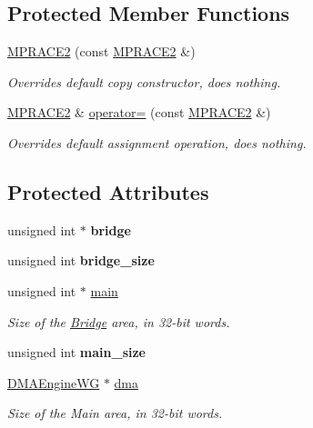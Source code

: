 \subsection*{Protected Member Functions}
\begin{CompactItemize}
\item 
\hyperlink{classmprace_1_1MPRACE2_b0}{MPRACE2} (const \hyperlink{classmprace_1_1MPRACE2}{MPRACE2} \&)
\begin{CompactList}\small\item\em Overrides default copy constructor, does nothing. \item\end{CompactList}\item 
\hyperlink{classmprace_1_1MPRACE2}{MPRACE2} \& \hyperlink{classmprace_1_1MPRACE2_b1}{operator=} (const \hyperlink{classmprace_1_1MPRACE2}{MPRACE2} \&)
\begin{CompactList}\small\item\em Overrides default assignment operation, does nothing. \item\end{CompactList}\end{CompactItemize}
\subsection*{Protected Attributes}
\begin{CompactItemize}
\item 
\hypertarget{classmprace_1_1MPRACE2_p0}{
unsigned int $\ast$ {\bf bridge}}
\label{classmprace_1_1MPRACE2_p0}

\item 
\hypertarget{classmprace_1_1MPRACE2_p1}{
unsigned int {\bf bridge\_\-size}}
\label{classmprace_1_1MPRACE2_p1}

\item 
\hypertarget{classmprace_1_1MPRACE2_p2}{
unsigned int $\ast$ \hyperlink{classmprace_1_1MPRACE2_p2}{main}}
\label{classmprace_1_1MPRACE2_p2}

\begin{CompactList}\small\item\em Size of the \hyperlink{classmprace_1_1Bridge}{Bridge} area, in 32-bit words. \item\end{CompactList}\item 
\hypertarget{classmprace_1_1MPRACE2_p3}{
unsigned int {\bf main\_\-size}}
\label{classmprace_1_1MPRACE2_p3}

\item 
\hypertarget{classmprace_1_1MPRACE2_p4}{
\hyperlink{classmprace_1_1DMAEngineWG}{DMAEngine\-WG} $\ast$ \hyperlink{classmprace_1_1MPRACE2_p4}{dma}}
\label{classmprace_1_1MPRACE2_p4}

\begin{CompactList}\small\item\em Size of the Main area, in 32-bit words. \item\end{CompactList}\end{CompactItemize}
